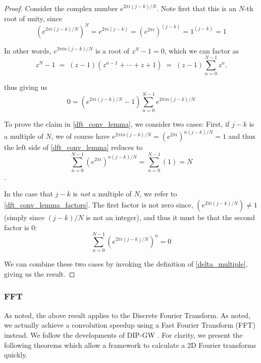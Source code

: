 		\begin{proof}
		
		Consider the complex number $e^{2\pi i (j-k)/N}$. Note first that this is an $N$-th root of unity, since
		\[
		\left(e^{2\pi i (j-k)/N}\right)^N = e^{2\pi i (j-k)} = \left(e^{2\pi i}\right)^{(j-k)}
		= 1^{(j-k)} = 1
		\]
	
	In other words, $e^{2\pi i n(j-k)/N}$ is a root of $z^N -1 = 0$, which we can factor as
	\begin{equation}
	z^N -1 \;=\; (z-1)\left(z^{n-1} + \cdots + z + 1\right) \;=\; (z-1)\sum_{n=0}^{N-1} z^n .
	\end{equation}

thus giving us
\begin{equation} \label{dft_conv_lemma_factors}
	0 = \left(e^{2\pi i(j-k)/N} - 1\right) \sum_{n=0}^{N-1} e^{2\pi i n(j-k)/N}
	\end{equation}
	
To prove the claim in \cref{dft_conv_lemma}, we consider two cases: First, if $j-k$ is a multiple of $N$, we of course have $e^{2\pi i n(j-k)/N} = \left(e^{2\pi i}\right)^{n(j-k)/N} = 1$  and thus the left side of \cref{dft_conv_lemma} reduces to 
\[
\sum_{n=0}^{N-1} \left(e^{2\pi i}\right)^{n(j-k)/N} = \sum_{n=0}^{N-1} \left(1\right) = N
\].

In the case that $j-k$ is \textit{not} a multiple of $N$, we refer to \cref{dft_conv_lemma_factors}.
The first factor is not zero since, $\left(e^{2\pi i (j-k)/N}\right) \ne 1$ (simply since $(j-k)/N$ is not an integer), and thus it must be that the second factor is 0:
\[
\sum_{n=0}^{N-1} \left(e^{2\pi i (j-k)/N}\right)^n = 0\]
	
	We can combine these two cases by invoking the definition of \cref{delta_multiple}, giving us the result.
		\end{proof}
				
		\subsubsection{FFT}
		As noted, the above result applies to the Discrete Fourier Transform. As noted, we actually achieve a convolution speedup using a Fast Fourier Transform (FFT) instead. We follow the developments of DIP-GW . For clarity, we present the following theorems which allow a framework to calculate a 2D Fourier transforms quickly.
		
